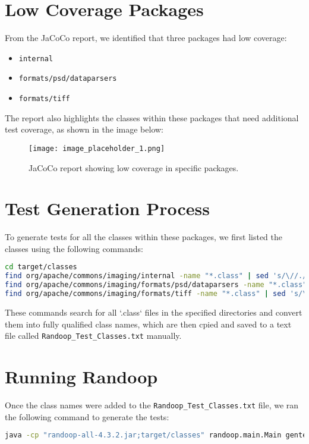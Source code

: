 \documentclass[a4paper,12pt]{report}
\begin{document}
\section{Low Coverage Packages}
From the JaCoCo report, we identified that three packages had low coverage: 
\begin{itemize}
    \item \texttt{internal}
    \item \texttt{formats/psd/dataparsers}
    \item \texttt{formats/tiff}
\end{itemize}
The report also highlights the classes within these packages that need additional test coverage, as shown in the image below:
\begin{figure}[H]
    \centering
    \texttt{[image: image\_placeholder\_1.png]} %
    \caption{JaCoCo report showing low coverage in specific packages.}
    \label{fig:jacoco-report}
\end{figure}

\section{Test Generation Process}
To generate tests for all the classes within these packages, we first listed the classes using the following commands:

\begin{lstlisting}[language=bash]
cd target/classes
find org/apache/commons/imaging/internal -name "*.class" | sed 's/\//./g' | sed 's/\.class\$//'
find org/apache/commons/imaging/formats/psd/dataparsers -name "*.class" | sed 's/\//./g' | sed 's/\.class\$//'
find org/apache/commons/imaging/formats/tiff -name "*.class" | sed 's/\//./g' | sed 's/\.class\$//'
\end{lstlisting}

These commands search for all `.class` files in the specified directories and convert them into fully qualified class names, which are then cpied and saved to a text file called \texttt{Randoop\_Test\_Classes.txt} manually.

\section{Running Randoop}
Once the class names were added to the \texttt{Randoop\_Test\_Classes.txt} file, we ran the following command to generate the tests:

\begin{lstlisting}[language=bash]
java -cp "randoop-all-4.3.2.jar;target/classes" randoop.main.Main gentests $(Get-Content Randoop_Test_Classes.txt | ForEach-Object \{ "--testclass=$\_"\} ) --time-limit=200 --junit-output-dir=src/test/java/org/apache/commons/imaging/randoop/
\end{lstlisting}
\end{document}
